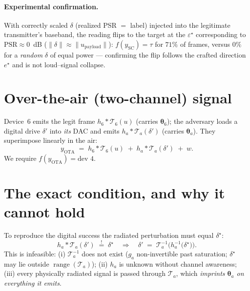 \documentclass[11pt]{article}
\newcommand{\Top}[1]{\mathcal{T}_{#1}}          %
\newcommand{\ba}{\bm{\theta}}
\newcommand{\Range}{\operatorname{range}}
\begin{document}
\paragraph{Experimental confirmation.} With correctly scaled $\delta$ (realized PSR $=$ label)
injected into the legitimate transmitter's baseband, the reading flips to the target at the
$\varepsilon^\star$ corresponding to $\mathrm{PSR}\approx0$~dB
($\|\delta\|\approx\|u_{\mathrm{payload}}\|$): $f(y_{\mathrm{SC}})=\tau$ for $71\%$ of frames,
versus $0\%$ for a \emph{random} $\delta$ of equal power --- confirming the flip follows the crafted
direction $e^\star$ and is not loud--signal collapse.

\section{Over-the-air (two-channel) signal}
Device~6 emits the legit frame $h_6*\Top{6}(u)$ (carries $\ba_6$); the adversary
loads a digital drive $\delta'$ into \emph{its} DAC and emits $h_a*\Top{a}(\delta')$
(carries $\ba_a$). They superimpose linearly in the air:
\begin{equation}
y_{\mathrm{OTA}} \;=\; h_6 * \Top{6}(u) \;+\; h_a * \Top{a}(\delta') \;+\; w .
\label{eq:ota}
\end{equation}
We require $f(y_{\mathrm{OTA}})=\text{dev }4$.

\section{The exact condition, and why it cannot hold}
To reproduce the digital success the radiated perturbation must equal
$\delta^\star$:
\begin{equation}
h_a * \Top{a}(\delta') \;\overset{!}{=}\; \delta^\star
\quad\Longrightarrow\quad
\delta' \;=\; \Top{a}^{-1}\!\Big(h_a^{-1}\big(\delta^\star\big)\Big).
\label{eq:invert}
\end{equation}
This is infeasible: (i) $\Top{a}^{-1}$ does not exist ($g_a$ non-invertible past
saturation; $\delta^\star$ may lie outside $\Range(\Top{a})$); (ii) $h_a$ is unknown
without channel awareness; (iii) every physically radiated signal is passed through
$\Top{a}$, which \emph{imprints $\ba_a$ on everything it emits}.
\end{document}
